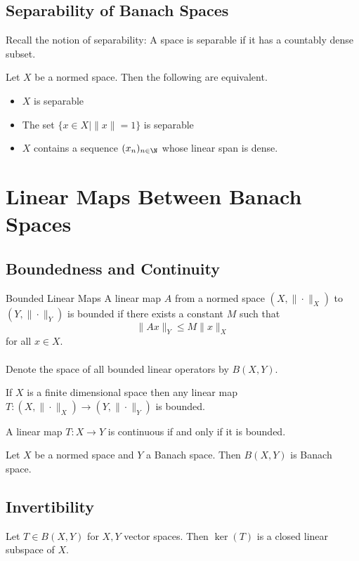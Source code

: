 \documentclass[a4paper]{article}
\begin{document}
\subsection{Separability of Banach Spaces}
Recall the notion of separability: A space is separable if it has a countably dense subset. 

\begin{lmm}{}{} Let $X$ be a normed space. Then the following are equivalent. 
\begin{itemize}
\item $X$ is separable
\item The set $\{x\in X|\|x\|=1\}$ is separable
\item $X$ contains a sequence $(x_n)_{n\in\N}$ whose linear span is dense. 
\end{itemize}
\end{lmm}

\pagebreak
\section{Linear Maps Between Banach Spaces}
\subsection{Boundedness and Continuity}
\begin{defn}{Bounded Linear Maps}{} A linear map $A$ from a normed space $(X,\|\cdot\|_X)$ to $(Y,\|\cdot\|_Y)$ is bounded if there exists a constant $M$ such that $$\|Ax\|_Y\leq M\|x\|_X$$ for all $x\in X$. \\~\\
Denote the space of all bounded linear operators by $B(X,Y)$. 
\end{defn}

\begin{lmm}{}{} If $X$ is a finite dimensional space then any linear map $T:(X,\|\cdot\|_X)\to(Y,\|\cdot\|_Y)$ is bounded. 
\end{lmm}

\begin{lmm}{}{} A linear map $T:X\to Y$ is continuous if and only if it is bounded. 
\end{lmm}

\begin{thm}{}{} Let $X$ be a normed space and $Y$ a Banach space. Then $B(X,Y)$ is Banach space. 
\end{thm}

\subsection{Invertibility}
\begin{crl}{}{} Let $T\in B(X,Y)$ for $X,Y$ vector spaces. Then $\ker(T)$ is a closed linear subspace of $X$. 
\end{crl}
\end{document}
